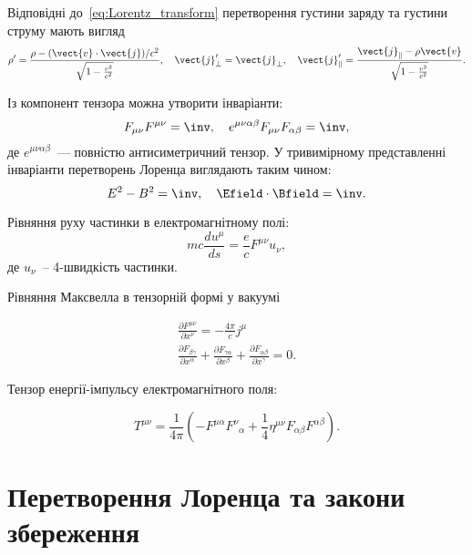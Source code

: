 \begin{Theory}
	Відповідні до~\eqref{eq:Lorentz_transform} перетворення густини заряду та густини струму мають вигляд
	\begin{equation}\label{eq:Lorentz_transform_j}
		\rho' = \frac{\rho - (\vect{v}\cdot\vect{j})/c^2}{\sqrt{1 - \frac{v^2}{c^2}}}, \quad \vect{j}'_{\perp} = \vect{j}_{\perp}, \quad
		\vect{j}'_{\parallel} = \frac{\vect{j}_{\parallel} - \rho \vect{v}} {\sqrt{1 - \frac{v^2}{c^2}}}.
	\end{equation}

	Із компонент тензора можна утворити інваріанти:
	\begin{equation*}
		F_{\mu\nu}F^{\mu\nu} = \inv, \quad e^{\mu\nu\alpha\beta}F_{\mu\nu}F_{\alpha\beta} = \inv,
	\end{equation*}
	де $e^{\mu\nu\alpha\beta}$~--- повністю антисиметричний тензор. У тривимірному представленні інваріанти перетворень Лоренца виглядають таким чином:
	\begin{equation*}
		E^2 - B^2 = \inv, \quad \Efield\cdot\Bfield = \inv.
	\end{equation*}

	Рівняння руху частинки в електромагнітному полі:
	\begin{equation}
		mc\frac{du^\mu}{ds} = \frac{e}{c}F^{\mu\nu}u_{\nu},
	\end{equation}
	де $u_{\nu}$~-- 4-швидкість частинки.

	Рівняння Максвелла в тензорній формі у вакуумі%

	\begin{gather}
		\frac{\partial F^{\mu\nu}}{\partial x^\nu} =                                                                                -\frac{4\pi}{c}j^\mu \label{eqn:rel_Maxwell_eqn_with_sources}\\
		\frac{\partial F_{\beta\gamma}}{\partial x^\alpha} + \frac{\partial F_{\gamma\alpha}}{\partial x^\beta} +\frac{\partial
				F_{\alpha\beta}}{\partial x^\gamma}  = 0. \label{eqn:rel_Maxwell_eqn_with_sourceless}
	\end{gather}

	Тензор енергії-імпульсу електромагнітного поля:

	\begin{equation}\label{rel_TEI}
		T^{\mu\nu} = \frac{1}{4\pi}\left( -F^{\mu \alpha}F^\nu_{\;\;\alpha} + \frac14\eta^{\mu\nu}F_{\alpha\beta}F^{\alpha\beta}\right).
	\end{equation}
\end{Theory}

\section{Перетворення Лоренца та закони збереження}

